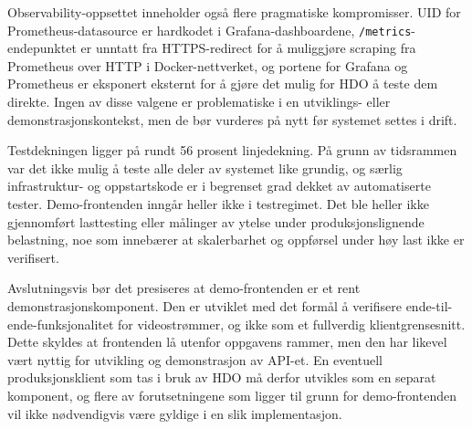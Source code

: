 Observability-oppsettet inneholder også flere pragmatiske kompromisser. UID for Prometheus-datasource er hardkodet i Grafana-dashboardene, \texttt{/metrics}-endepunktet er unntatt fra HTTPS-redirect for å muliggjøre scraping fra Prometheus over HTTP i Docker-nettverket, og portene for Grafana og Prometheus er eksponert eksternt for å gjøre det mulig for HDO å teste dem direkte. Ingen av disse valgene er problematiske i en utviklings- eller demonstrasjonskontekst, men de bør vurderes på nytt før systemet settes i drift.


Testdekningen ligger på rundt 56 prosent linjedekning. På grunn av tidsrammen var det ikke mulig å teste alle deler av systemet like grundig, og særlig infrastruktur- og oppstartskode er i begrenset grad dekket av automatiserte tester. Demo-frontenden inngår heller ikke i testregimet. Det ble heller ikke gjennomført lasttesting eller målinger av ytelse under produksjonslignende belastning, noe som innebærer at skalerbarhet og oppførsel under høy last ikke er verifisert.


Avslutningsvis bør det presiseres at demo-frontenden er et rent demonstrasjonskomponent. Den er utviklet med det formål å verifisere ende-til-ende-funksjonalitet for videostrømmer, og ikke som et fullverdig klientgrensesnitt. Dette skyldes at frontenden lå utenfor oppgavens rammer, men den har likevel vært nyttig for utvikling og demonstrasjon av API-et. En eventuell produksjonsklient som tas i bruk av HDO må derfor utvikles som en separat komponent, og flere av forutsetningene som ligger til grunn for demo-frontenden vil ikke nødvendigvis være gyldige i en slik implementasjon.